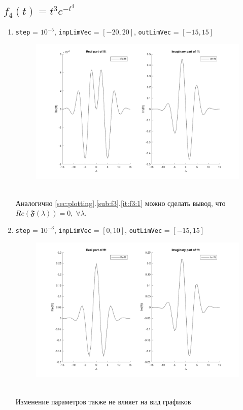 \documentclass[11pt, oneside, final]{article}
\numberwithin{equation}{section}
\newcommand \four[1][\lambda]{\mathfrak{F}(#1)}
\begin{document}
    \subsection{\( f_4(t) = t^3e^{-t^4}  \)} %
    \label{sub:f4}
    \begin{enumerate}
        \item 
        \label{it:f41}
        \texttt{step} = \(10^{-5}\), \texttt{inpLimVec} = \( [-20, 20] \), \texttt{outLimVec} = \( [-15, 15] \)
        \begin{figure}[!h]
            \centering
            \includegraphics[width=\linewidth]{f4fig1}
            \label{pic:f4:1}
        \end{figure} \\
        Аналогично \ref{sec:plotting}.\ref{sub:f3}.\ref{it:f3:1} можно сделать вывод, что \(Re(\four) = 0, \; \forall \lambda \). \\
        \clearpage
        \item
        \label{it:f42}
        \texttt{step} = \(10^{-3}\), \texttt{inpLimVec} = \( [0, 10] \), \texttt{outLimVec} = \( [-15, 15] \)
        \begin{figure}[!h]
            \centering
            \includegraphics[width=\linewidth]{f4fig2}
            \label{pic:f4:2}
        \end{figure} \\
        Изменение параметров также не влияет на вид графиков
    \end{enumerate}
    \clearpage
    \appendix
\end{document}
